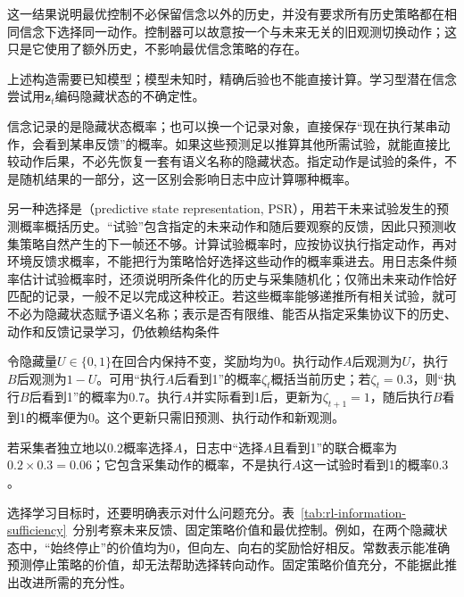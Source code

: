 这一结果说明最优控制不必保留信念以外的历史，并没有要求所有历史策略都在相同信念下选择同一动作。控制器可以故意按一个与未来无关的旧观测切换动作；这只是它使用了额外历史，不影响最优信念策略的存在。

上述构造需要已知模型；模型未知时，精确后验也不能直接计算。学习型潜在信念尝试用$\bm z_t$编码隐藏状态的不确定性。

信念记录的是隐藏状态概率；也可以换一个记录对象，直接保存“现在执行某串动作，会看到某串反馈”的概率。如果这些预测足以推算其他所需试验，就能直接比较动作后果，不必先恢复一套有语义名称的隐藏状态。指定动作是试验的条件，不是随机结果的一部分，这一区别会影响日志中应计算哪种概率。

另一种选择是（predictive state representation, PSR），用若干未来试验发生的预测概率概括历史。“试验”包含指定的未来动作和随后要观察的反馈，因此只预测收集策略自然产生的下一帧还不够。计算试验概率时，应按协议执行指定动作，再对环境反馈求概率，不能把行为策略恰好选择这些动作的概率乘进去。用日志条件频率估计试验概率时，还须说明所条件化的历史与采集随机化；仅筛出未来动作恰好匹配的记录，一般不足以完成这种校正。若这些概率能够递推所有相关试验，就可不必为隐藏状态赋予语义名称；表示是否有限维、能否从指定采集协议下的历史、动作和反馈记录学习，仍依赖结构条件

\begin{example}[动作试验概率与一次预测更新]
  \label{ex:rl-information-psr-test}
  令隐藏量$U\in\{0,1\}$在回合内保持不变，奖励均为0。执行动作$A$后观测为$U$，执行$B$后观测为$1-U$。可用“执行$A$后看到1”的概率$\zeta_t$概括当前历史；若$\zeta_t=0.3$，则“执行$B$后看到1”的概率为$0.7$。执行$A$并实际看到1后，更新为$\zeta_{t+1}=1$，随后执行$B$看到1的概率便为0。这个更新只需旧预测、执行动作和新观测。

  若采集者独立地以$0.2$概率选择$A$，日志中“选择$A$且看到1”的联合概率为$0.2\times0.3=0.06$；它包含采集动作的概率，不是执行$A$这一试验时看到1的概率$0.3$。
\end{example}

选择学习目标时，还要明确表示对什么问题充分。表~\ref{tab:rl-information-sufficiency}~分别考察未来反馈、固定策略价值和最优控制。例如，在两个隐藏状态中，“始终停止”的价值均为0，但向左、向右的奖励恰好相反。常数表示能准确预测停止策略的价值，却无法帮助选择转向动作。固定策略价值充分，不能据此推出改进所需的充分性。

